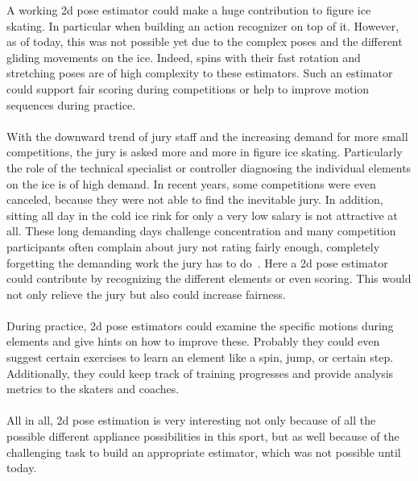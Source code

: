     A working 2d pose estimator could make a huge contribution to figure ice skating.
    In particular when building an action recognizer on top of it.
    However, as of today, this was not possible yet due to the complex poses and the different gliding movements
    on the ice.
    Indeed, spins with their fast rotation and stretching poses are of high complexity to these estimators.
    Such an estimator could support fair scoring during competitions or help to improve motion sequences during
    practice.
    \\\mbox{}\\
    With the downward trend of jury staff and the increasing demand for more small competitions, the jury is asked
    more and more in figure ice skating.
    Particularly the role of the technical specialist or controller diagnosing the individual elements on the ice
    is of high demand.
    In recent years, some competitions were even canceled, because they were not able to find the inevitable jury.
    In addition, sitting all day in the cold ice rink for only a very low salary is not attractive at all.
    These long demanding days challenge concentration and many competition participants often complain about jury
    not rating fairly enough,
    completely forgetting the demanding work the jury has to do~\cite{ungerjuryinterview, juryunger3minutes, unfairjudge}.
    Here a 2d pose estimator could contribute by recognizing the different elements or even scoring.
    This would not only relieve the jury but also could increase fairness.
    \\\mbox{}\\
    During practice, 2d pose estimators could examine the specific motions during elements and give hints on how to
    improve these.
    Probably they could even suggest certain exercises to learn an element like a spin, jump, or certain step.
    Additionally, they could keep track of training progresses and provide analysis metrics to the skaters and coaches.
    \\\mbox{}\\
    All in all, 2d pose estimation is very interesting not only because of all the possible different appliance
    possibilities in this sport,
    but as well because of the
    challenging task to build an appropriate estimator, which was not possible until today.




